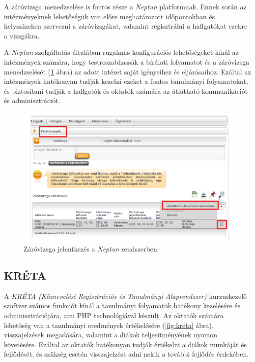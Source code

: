 A záróvizsga menedzselése is fontos része a \textit{Neptun} platformnak. Ennek során az intézményeknek lehetőségük van előre meghatározott időpontokban és helyszíneken szervezni a záróvizsgákat, valamint regisztrálni a hallgatókat ezekre a vizsgákra.

A \textit{Neptun} szolgáltatás általában rugalmas konfigurációs lehetőségeket kínál az intézmények számára, hogy testreszabhassák a bírálati folyamatot és a záróvizsga menedzselését (\ref{fig:neptunzv} ábra) az adott intézet saját igényeihez és eljárásaihoz. Ezáltal az intézmények hatékonyan tudják kezelni ezeket a fontos tanulmányi folyamatokat, és biztosítani tudják a hallgatók és oktatók számára az átlátható kommunikációt és adminisztrációt.

\begin{figure}[h]
\centering
\includegraphics[scale=0.7]{images/Neptun.png}
\caption{Záróvizsga jelentkezés a \textit{Neptun} rendszerben \cite{neptunzv}}
\label{fig:neptunzv}
\end{figure}

\newpage
\subsection{KRÉTA}

A \textit{KRÉTA (Köznevelési Regisztrációs és Tanulmányi Alaprendszer)} \cite{kreta} kurzuskezelő szoftver számos funkciót kínál a tanulmányi folyamatok hatékony kezelésére és adminisztrációjára, ami PHP \cite{PHP} technológiával készült. Az oktatók számára lehetőség van a tanulmányi eredmények értékelésére (\ref{fig:kreta} ábra), visszajelzések megadására, valamint a diákok teljesítményének nyomon követésére. Ezáltal az oktatók hatékonyan tudják értékelni a diákok munkáját és fejlődését, és szükség esetén visszajelzést adni nekik a további fejlődés érdekében.

